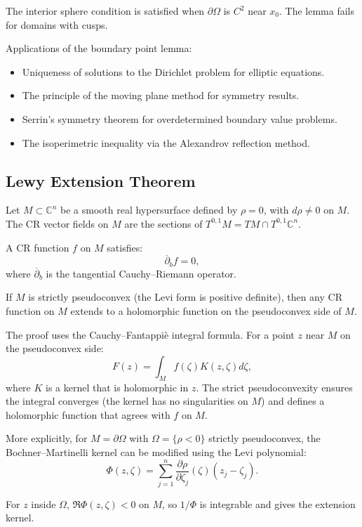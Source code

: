 The interior sphere condition is satisfied when $\partial \Omega$ is $C^2$ near $x_0$. The lemma fails for domains with cusps.

Applications of the boundary point lemma:
\begin{itemize}
    \item Uniqueness of solutions to the Dirichlet problem for elliptic equations.
    \item The principle of the moving plane method for symmetry results.
    \item Serrin's symmetry theorem for overdetermined boundary value problems.
    \item The isoperimetric inequality via the Alexandrov reflection method.
\end{itemize}

\subsection{Lewy Extension Theorem}

Let $M \subset \mathbb{C}^n$ be a smooth real hypersurface defined by $\rho = 0$, with $d\rho \neq 0$ on $M$. The CR vector fields on $M$ are the sections of $T^{0,1}M = TM \cap T^{0,1}\mathbb{C}^n$.

A CR function $f$ on $M$ satisfies:
\[
\overline{\partial}_b f = 0,
\]
where $\overline{\partial}_b$ is the tangential Cauchy--Riemann operator.

\begin{theorem}
If $M$ is strictly pseudoconvex (the Levi form is positive definite), then any CR function on $M$ extends to a holomorphic function on the pseudoconvex side of $M$.
\end{theorem}

The proof uses the Cauchy--Fantappi\`{e} integral formula. For a point $z$ near $M$ on the pseudoconvex side:
\[
F(z) = \int_M f(\zeta) K(z, \zeta) d\zeta,
\]
where $K$ is a kernel that is holomorphic in $z$. The strict pseudoconvexity ensures the integral converges (the kernel has no singularities on $M$) and defines a holomorphic function that agrees with $f$ on $M$.

More explicitly, for $M = \partial \Omega$ with $\Omega = \{\rho < 0\}$ strictly pseudoconvex, the Bochner--Martinelli kernel can be modified using the Levi polynomial:
\[
\Phi(z, \zeta) = \sum_{j=1}^n \frac{\partial \rho}{\partial \zeta_j}(\zeta) (z_j - \zeta_j).
\]

For $z$ inside $\Omega$, $\Re \Phi(z, \zeta) < 0$ on $M$, so $1/\Phi$ is integrable and gives the extension kernel.

